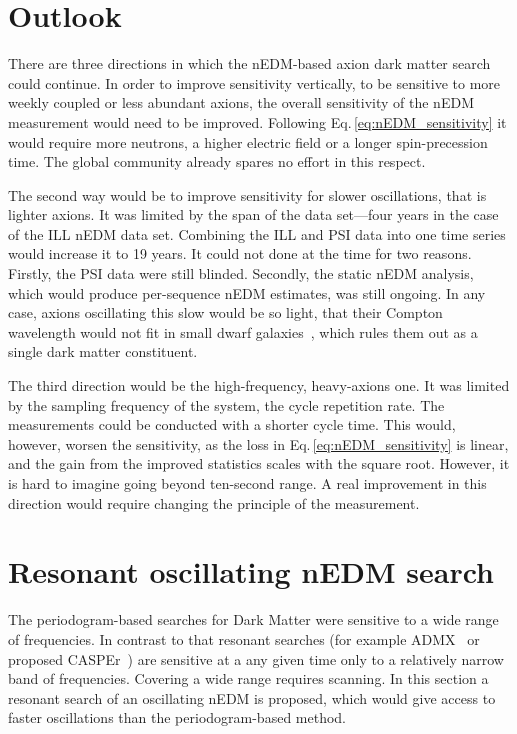 \section{Outlook}
There are three directions in which the nEDM-based axion dark matter search could continue.
In order to improve sensitivity vertically, to be sensitive to more weekly coupled or less abundant axions, the overall sensitivity of the nEDM measurement would need to be improved. Following Eq.\,\ref{eq:nEDM_sensitivity} it would require more neutrons, a higher electric field or a longer spin-precession time.
The global community already spares no effort in this respect.

The second way would be to improve sensitivity for slower oscillations, that is  lighter axions. It was limited by the span of the data set---four years in the case of the ILL nEDM data set. Combining the ILL and PSI data into one time series would increase it to 19 years. It could not done at the time for two reasons. Firstly, the PSI data were still blinded. Secondly, the static nEDM analysis, which would produce per-sequence nEDM estimates, was still ongoing. In any case, axions oscillating this slow would be so light, that their Compton wavelength would not fit in small dwarf galaxies~\cite{Marsh2015Review}, which rules them out as a single dark matter constituent.

The third direction would be the high-frequency, heavy-axions one. It was limited by the sampling frequency of the system, the cycle repetition rate.
The measurements could be conducted with a shorter cycle time. This would, however, worsen the sensitivity, as the loss in Eq.\,\ref{eq:nEDM_sensitivity} is linear, and the gain from the improved statistics scales with the square root.
However, it is hard to imagine going beyond ten-second range. A real improvement in this direction would require changing the principle of the measurement.




\section{Resonant oscillating nEDM search}
The periodogram-based searches for Dark Matter were sensitive to a wide range of frequencies. In contrast to that resonant searches (for example ADMX~\cite{PhysRevLett.104.041301} or proposed CASPEr~\cite{CASPEr2014}) are sensitive at a any given time only to a relatively narrow band of frequencies. Covering a wide range requires scanning. In this section a resonant search of an oscillating nEDM is proposed, which would give access to faster oscillations than the periodogram-based method.

